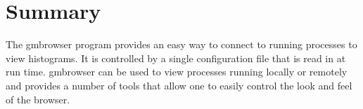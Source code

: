 \documentclass[12pt]{article}
\begin{document}
\section{Summary}
The gmbrowser program provides an easy way to connect to 
running processes to view histograms. It is controlled by a 
single configuration file that is read in at run time. gmbrowser
can be used to view processes running locally or remotely and
provides a number of tools that allow one to easily control the 
look and feel of the browser. 
\end{document}

